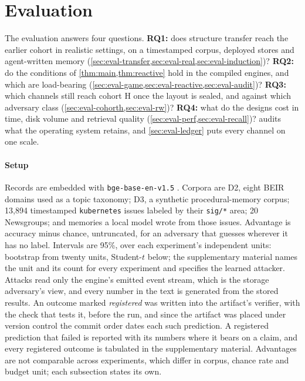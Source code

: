 \section{Evaluation}
\label{sec:eval}

The evaluation answers four questions.
\textbf{RQ1:} does structure transfer reach the earlier cohort in realistic settings, on a
timestamped corpus, deployed stores and agent-written memory
(\cref{sec:eval-transfer,sec:eval-real,sec:eval-induction})?
\textbf{RQ2:} do the conditions of \cref{thm:main,thm:reactive} hold in the compiled engines, and
which are load-bearing (\cref{sec:eval-game,sec:eval-reactive,sec:eval-audit})?
\textbf{RQ3:} which channels still reach cohort H once the layout is sealed, and against which
adversary class (\cref{sec:eval-cohorth,sec:eval-rw})?
\textbf{RQ4:} what do the designs cost in time, disk volume and retrieval quality
(\cref{sec:eval-perf,sec:eval-recall})?
 audits what the operating system retains, and \cref{sec:eval-ledger}
puts every channel on one scale.

\paragraph{Setup}
Records are embedded with \texttt{bge-base-en-v1.5} \cite{xiao2024cpack}. Corpora are D2, eight
BEIR domains \cite{thakur2021beir} used as a topic taxonomy; D3, a synthetic procedural-memory
corpus; 13{,}894 timestamped \texttt{kubernetes} issues labeled by their \texttt{sig/*} area; 20
Newsgroups; and memories a local model wrote from those issues. Advantage is accuracy minus chance,
untruncated, for an adversary that guesses wherever it has no label. Intervals are 95\%, over each
experiment's independent units: bootstrap from twenty units, Student-$t$ below; the supplementary
material names the unit and its count for every experiment and specifies the learned attacker.
Attacks read only the engine's emitted event stream, which is the storage adversary's view, and
every number in the text is generated from the stored results. An outcome marked
\emph{registered} was written into the artifact's verifier, with the check that tests it, before the
run, and since the artifact was placed under version control the commit order dates each such
prediction. A registered prediction that failed is reported with its numbers where it bears on
a claim, and every registered outcome is tabulated in the supplementary material. Advantages are
not comparable across experiments, which differ in corpus, chance rate and budget unit; each
subsection states its own.

